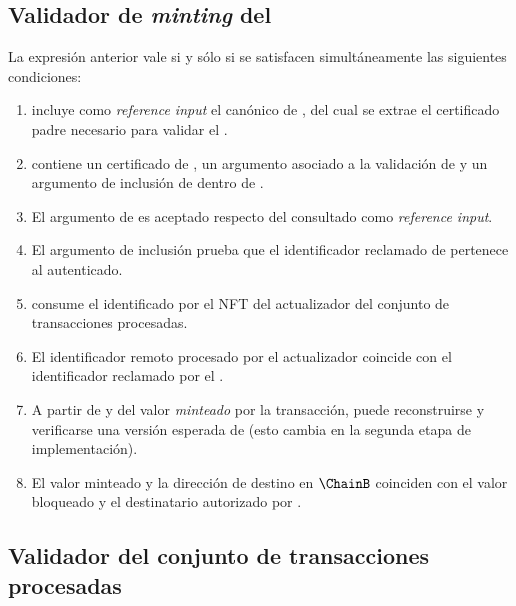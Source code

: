 \subsection{Validador de \textit{minting} del \zkBridge}

\begin{center}
\MintValidatorNotation{\MintingValidator}
\end{center}

La expresión anterior vale si y sólo si se satisfacen simultáneamente las siguientes condiciones:

\begin{enumerate}[noitemsep]
  \item \tx incluye como \textit{reference input} el \UTxO canónico de \StakeDistribution \StakeDistributionUTxO, del cual se extrae el certificado padre \StakeDistributionCertificate necesario para validar el \TransactionSnapshot.
  \item \redeemer contiene un certificado \TransactionSnapshotCertificate de \TransactionSnapshot, un argumento \ZK asociado a la validación de \TransactionSnapshotCertificate y un argumento \ZK de inclusión de \LockTx dentro de \TransactionSnapshotCertificate.
  \item El argumento \ZK de \TransactionSnapshotCertificate es aceptado respecto del \StakeDistributionCertificate consultado como \textit{reference input}.
  \item El argumento \ZK de inclusión prueba que el identificador reclamado de \LockTx pertenece al \TransactionSnapshotCertificate autenticado.
  \item \tx consume el \UTxO identificado por el NFT del actualizador del conjunto de transacciones procesadas.
  \item El identificador remoto procesado por el actualizador coincide con el identificador reclamado por el \MintingValidator.
  \item A partir de \redeemer y del valor \textit{minteado} por la transacción, puede reconstruirse y verificarse una versión esperada de \LockTx (esto cambia en la segunda etapa de implementación).
  \item El valor minteado y la dirección de destino en $\ChainB$ coinciden con el valor bloqueado y el destinatario autorizado por \LockTx.
\end{enumerate}

\subsection{Validador del conjunto de transacciones procesadas}

